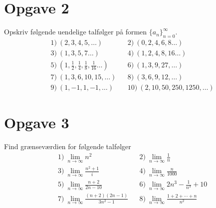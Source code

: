 \section*{Opgave 2}
Opskriv følgende uendelige talfølger på formen $\{a_n\}_{n=0}^\infty$.
\begin{align*}
&1) \  (2,3,4,5,\hdots)   &&2) \ (0,2,4,6,8\hdots)    \\
&3) \  (1,3,5,7\hdots)   &&4) \ (1,2,4,8,16\hdots)    \\
&5) \  \left(1,\frac{1}{2},\frac{1}{4},\frac{1}{8},\frac{1}{16}\hdots\right)   &&6) \ (1,3,9,27,\hdots)    \\
&7) \  (1,3,6,10,15,\hdots)   &&8) \  (3,6,9,12,\hdots)\\
&9) \ (1,-1,1,-1,\hdots)   &&10) \ (2,10,50,250,1250,\hdots)
\end{align*} 
\section*{Opgave 3}
Find grænseværdien for følgende talfølger
\begin{align*}
&1) \ \lim_{n\to \infty} n^2 &&2) \ \lim_{n\to \infty} \frac{1}{n}   \\
&3) \ \lim_{n\to \infty} \frac{n^2+1}{i} &&4) \ \lim_{n\to \infty}\frac{n}{1000}   \\
&5) \ \lim_{n\to \infty} \frac{n+2}{2n-10} &&6) \ \lim_{n\to \infty} 2n^3-\frac{1}{n^3}+10   \\
&7) \ \lim_{n\to \infty} \frac{(n+2)(2n-1)}{3n^2-1} &&8) \ \lim_{n\to \infty}\frac{1+2+\cdots+n}{n^2}   \\
\end{align*}